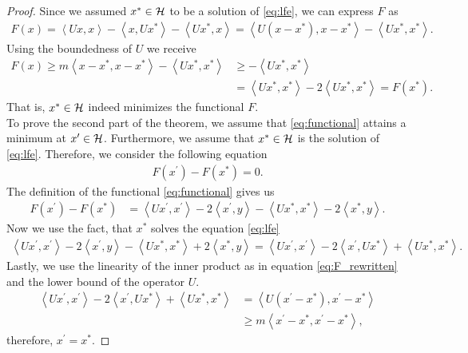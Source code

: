 \begin{proof}
Since we assumed $x^{\ast} \in \mathcal{H}$ to be a solution of \eqref{eq:lfe}, we can express $F$ as
\begin{align}\label{eq:F_rewritten}
F(x) = \left\langle Ux, x \right\rangle - \left\langle x, Ux^{\ast} \right\rangle - \left\langle Ux^{\ast}, x \right\rangle = \left\langle U(x - x^{\ast}), x - x^{\ast} \right\rangle - \left\langle Ux^{\ast}, x^{\ast} \right\rangle.
\end{align}
Using the boundedness of $U$ we receive
\begin{align}\label{eq:1.8}
F(x) \geq m\left\langle x - x^{\ast}, x - x^{\ast} \right\rangle - \left\langle Ux^{\ast}, x^{\ast} \right\rangle &\geq - \left\langle Ux^{\ast}, x^{\ast} \right\rangle\nonumber\\
&= \left\langle Ux^{\ast}, x^{\ast} \right\rangle  -2\left\langle Ux^{\ast}, x^{\ast} \right\rangle = F(x^{\ast}).
\end{align}
That is, $x^{\ast} \in \mathcal{H}$ indeed minimizes the functional $F$.\\
To prove the second part of the theorem, we assume that \eqref{eq:functional} attains a minimum at $x^{\prime} \in \mathcal{H}$. Furthermore, we assume that $x^{\ast}\in\mathcal{H}$ is the solution of \eqref{eq:lfe}. Therefore, we consider the following equation
\begin{align*}
F(x^{\prime}) - F(x^{\ast}) = 0.
\end{align*}
The definition of the functional \eqref{eq:functional} gives us
\begin{align*}
F(x^{\prime}) - F(x^{\ast}) &= \left\langle Ux^{\prime}, x^{\prime}\right\rangle -  2\left\langle x^{\prime}, y\right\rangle - \left\langle Ux^{\ast}, x^{\ast}\right\rangle - 2 \left\langle x^{\ast}, y\right\rangle.
\end{align*}
Now we use the fact, that $x^{\ast}$ solves the equation \eqref{eq:lfe}
\begin{align*}
\left\langle Ux^{\prime}, x^{\prime}\right\rangle -  2\left\langle x^{\prime}, y\right\rangle - \left\langle Ux^{\ast}, x^{\ast}\right\rangle + 2 \left\langle x^{\ast}, y\right\rangle
= \left\langle Ux^{\prime}, x^{\prime}\right\rangle - 2 \left\langle x^{\prime}, Ux^{\ast}\right\rangle + \left\langle Ux^{\ast}, x^{\ast}\right\rangle.
\end{align*}
Lastly, we use the linearity of the inner product as in equation \eqref{eq:F_rewritten} and the lower bound of the operator $U$.
\begin{align*}
\left\langle Ux^{\prime}, x^{\prime}\right\rangle - 2 \left\langle x^{\prime}, Ux^{\ast}\right\rangle + \left\langle Ux^{\ast}, x^{\ast}\right\rangle &=\left\langle U(x^{\prime} - x^{\ast}), x^{\prime} - x^{\ast} \right\rangle\\
&\geq m \left\langle x^{\prime} - x^{\ast}, x^{\prime} - x^{\ast} \right\rangle,
\end{align*}
therefore, $x^{\prime} = x^{\ast}$.
\end{proof}


